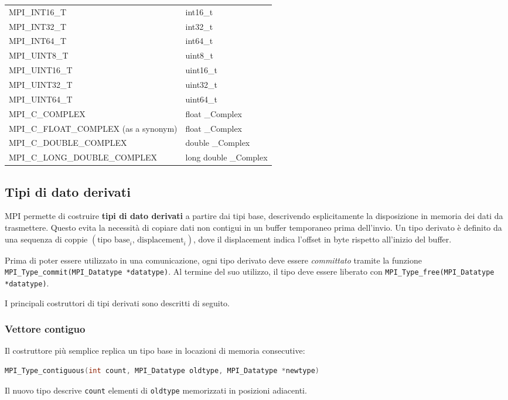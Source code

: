 \begin{table}[H]
\begin{tabular}{ll}
MPI\_INT16\_T                          & int16\_t \\
MPI\_INT32\_T                          & int32\_t \\
MPI\_INT64\_T                          & int64\_t \\
MPI\_UINT8\_T                          & uint8\_t \\
MPI\_UINT16\_T                         & uint16\_t \\
MPI\_UINT32\_T                         & uint32\_t \\
MPI\_UINT64\_T                         & uint64\_t \\
MPI\_C\_COMPLEX                        & float \_Complex \\
MPI\_C\_FLOAT\_COMPLEX (as a synonym)  & float \_Complex \\
MPI\_C\_DOUBLE\_COMPLEX                & double \_Complex \\
MPI\_C\_LONG\_DOUBLE\_COMPLEX          & long double \_Complex \\
\bottomrule
\end{tabular}
\end{table}

\subsection{Tipi di dato derivati}
MPI permette di costruire \textbf{tipi di dato derivati} a partire dai tipi base, descrivendo esplicitamente la disposizione in memoria dei dati da trasmettere. Questo evita la necessità di copiare dati non contigui in un buffer temporaneo prima dell'invio. Un tipo derivato è definito da una sequenza di coppie \((\text{tipo base}_i,\, \text{displacement}_i)\), dove il displacement indica l'offset in byte rispetto all'inizio del buffer.

Prima di poter essere utilizzato in una comunicazione, ogni tipo derivato deve essere \emph{committato} tramite la funzione \texttt{MPI\_Type\_commit(MPI\_Datatype *datatype)}.
Al termine del suo utilizzo, il tipo deve essere liberato con \texttt{MPI\_Type\_free(MPI\_Datatype *datatype)}.

I principali costruttori di tipi derivati sono descritti di seguito.

\subsubsection{Vettore contiguo}
Il costruttore più semplice replica un tipo base in locazioni di memoria consecutive:
\begin{lstlisting}[language=C, numbers=none]
MPI_Type_contiguous(int count, MPI_Datatype oldtype, MPI_Datatype *newtype)
\end{lstlisting}
Il nuovo tipo descrive \texttt{count} elementi di \texttt{oldtype} memorizzati in posizioni adiacenti.

